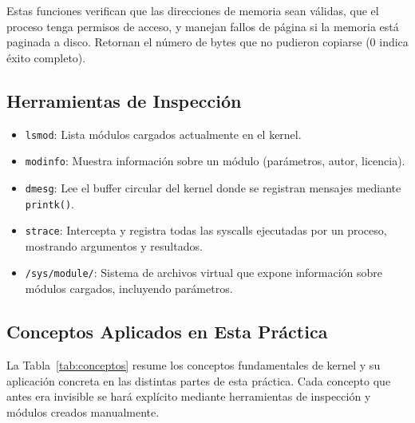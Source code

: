 \documentclass[conference]{IEEEtran}
\begin{document}
Estas funciones verifican que las direcciones de memoria sean válidas, que el proceso tenga permisos de acceso, y manejan fallos de página si la memoria está paginada a disco. Retornan el número de bytes que no pudieron copiarse (0 indica éxito completo).

\subsection{Herramientas de Inspección}

\begin{itemize}
	\item \texttt{lsmod}: Lista módulos cargados actualmente en el kernel.
	\item \texttt{modinfo}: Muestra información sobre un módulo (parámetros, autor, licencia).
	\item \texttt{dmesg}: Lee el buffer circular del kernel donde se registran mensajes mediante \texttt{printk()}.
	\item \texttt{strace}: Intercepta y registra todas las syscalls ejecutadas por un proceso, mostrando argumentos y resultados.
	\item \texttt{/sys/module/}: Sistema de archivos virtual que expone información sobre módulos cargados, incluyendo parámetros.
\end{itemize}

\subsection{Conceptos Aplicados en Esta Práctica}

La Tabla~\ref{tab:conceptos} resume los conceptos fundamentales de kernel y su aplicación concreta en las distintas partes de esta práctica. Cada concepto que antes era invisible se hará explícito mediante herramientas de inspección y módulos creados manualmente.
\end{document}
